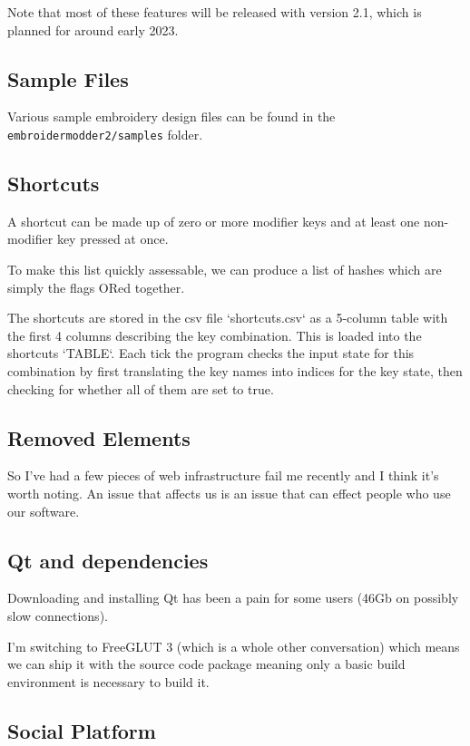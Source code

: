 \documentclass[a4paper]{report}
\begin{document}
Note that most of these features will be released with version 2.1, which is planned for around
early 2023.

\subsection{Sample Files}

Various sample embroidery design files can be found in the
\texttt{embroidermodder2/samples} folder.

\subsection{Shortcuts}

A shortcut can be made up of zero or more modifier keys and at least one non-modifier key
pressed at once.

To make this list quickly assessable, we can produce a list of hashes which are simply the
flags ORed together.

The shortcuts are stored in the csv file `shortcuts.csv` as a 5-column table
with the first 4 columns describing the key combination. This is loaded into
the shortcuts `TABLE`. Each tick the program checks the input state for this
combination by first translating the key names into indices for the key state,
then checking for whether all of them are set to true.

\subsection{Removed Elements}

So I've had a few pieces of web infrastructure fail me recently and I think
it's worth noting. An issue that affects us is an issue that can effect people
who use our software.

\subsection{Qt and dependencies}

Downloading and installing Qt has been a pain for some users (46Gb on possibly
slow connections).

I'm switching to FreeGLUT 3 (which is a whole other conversation) which means
we can ship it with the source code package meaning only a basic build
environment is necessary to build it.

\subsection{Social Platform}
\end{document}
